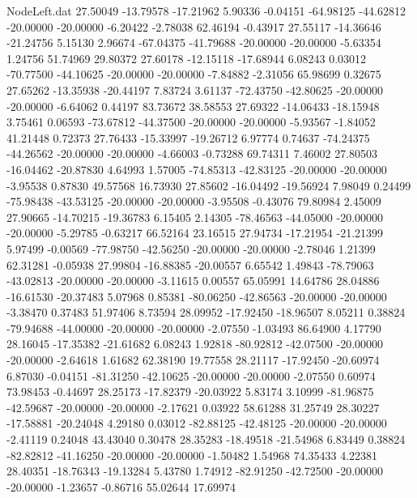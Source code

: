 \begin{filecontents}{NodeLeft.dat}
  27.50049  -13.79578  -17.21962     5.90336   -0.04151  -64.98125  -44.62812  -20.00000  -20.00000   -6.20422   -2.78038   62.46194   -0.43917
  27.55117  -14.36646  -21.24756     5.15130    2.96674  -67.04375  -41.79688  -20.00000  -20.00000   -5.63354    1.24756   51.74969   29.80372
  27.60178  -12.15118  -17.68944     6.08243    0.03012  -70.77500  -44.10625  -20.00000  -20.00000   -7.84882   -2.31056   65.98699    0.32675
  27.65262  -13.35938  -20.44197     7.83724    3.61137  -72.43750  -42.80625  -20.00000  -20.00000   -6.64062    0.44197   83.73672   38.58553
  27.69322  -14.06433  -18.15948     3.75461    0.06593  -73.67812  -44.37500  -20.00000  -20.00000   -5.93567   -1.84052   41.21448    0.72373
  27.76433  -15.33997  -19.26712     6.97774    0.74637  -74.24375  -44.26562  -20.00000  -20.00000   -4.66003   -0.73288   69.74311    7.46002
  27.80503  -16.04462  -20.87830     4.64993    1.57005  -74.85313  -42.83125  -20.00000  -20.00000   -3.95538    0.87830   49.57568   16.73930
  27.85602  -16.04492  -19.56924     7.98049    0.24499  -75.98438  -43.53125  -20.00000  -20.00000   -3.95508   -0.43076   79.80984    2.45009
  27.90665  -14.70215  -19.36783     6.15405    2.14305  -78.46563  -44.05000  -20.00000  -20.00000   -5.29785   -0.63217   66.52164   23.16515
  27.94734  -17.21954  -21.21399     5.97499   -0.00569  -77.98750  -42.56250  -20.00000  -20.00000   -2.78046    1.21399   62.31281   -0.05938
  27.99804  -16.88385  -20.00557     6.65542    1.49843  -78.79063  -43.02813  -20.00000  -20.00000   -3.11615    0.00557   65.05991   14.64786
  28.04886  -16.61530  -20.37483     5.07968    0.85381  -80.06250  -42.86563  -20.00000  -20.00000   -3.38470    0.37483   51.97406    8.73594
  28.09952  -17.92450  -18.96507     8.05211    0.38824  -79.94688  -44.00000  -20.00000  -20.00000   -2.07550   -1.03493   86.64900    4.17790
  28.16045  -17.35382  -21.61682     6.08243    1.92818  -80.92812  -42.07500  -20.00000  -20.00000   -2.64618    1.61682   62.38190   19.77558
  28.21117  -17.92450  -20.60974     6.87030   -0.04151  -81.31250  -42.10625  -20.00000  -20.00000   -2.07550    0.60974   73.98453   -0.44697
  28.25173  -17.82379  -20.03922     5.83174    3.10999  -81.96875  -42.59687  -20.00000  -20.00000   -2.17621    0.03922   58.61288   31.25749
  28.30227  -17.58881  -20.24048     4.29180    0.03012  -82.88125  -42.48125  -20.00000  -20.00000   -2.41119    0.24048   43.43040    0.30478
  28.35283  -18.49518  -21.54968     6.83449    0.38824  -82.82812  -41.16250  -20.00000  -20.00000   -1.50482    1.54968   74.35433    4.22381
  28.40351  -18.76343  -19.13284     5.43780    1.74912  -82.91250  -42.72500  -20.00000  -20.00000   -1.23657   -0.86716   55.02644   17.69974

\end{filecontents}
